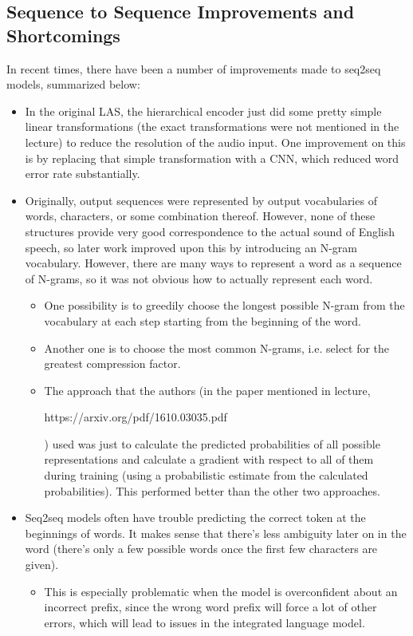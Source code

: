 \subsection{Sequence to Sequence Improvements and Shortcomings}

In recent times, there have been a number of improvements made to seq2seq models, summarized below:
\begin{itemize}
\item In the original LAS, the hierarchical encoder just did some pretty simple linear transformations (the exact transformations were not mentioned in the lecture) to reduce the resolution of the audio input. One improvement on this is by replacing that simple transformation with a CNN, which reduced word error rate substantially.
\item Originally, output sequences were represented by output vocabularies of words, characters, or some combination thereof. However, none of these structures provide very good correspondence to the actual sound of English speech, so later work improved upon this by introducing an N-gram vocabulary. However, there are many ways to represent a word as a sequence of N-grams, so it was not obvious how to actually represent each word.
\begin{itemize}
\item One possibility is to greedily choose the longest possible N-gram from the vocabulary at each step starting from the beginning of the word.
\item Another one is to choose the most common N-grams, i.e. select for the greatest compression factor.
\item The approach that the authors (in the paper mentioned in lecture, \begin{tt}https://arxiv.org/pdf/1610.03035.pdf\end{tt}) used was just to calculate the predicted probabilities of all possible representations and calculate a gradient with respect to all of them during training (using a probabilistic estimate from the calculated probabilities). This performed better than the other two approaches.
\end{itemize}
\item Seq2seq models often have trouble predicting the correct token at the beginnings of words. It makes sense that there's less ambiguity later on in the word (there's only a few possible words once the first few characters are given).
\begin{itemize}
\item This is especially problematic when the model is overconfident about an incorrect prefix, since the wrong word prefix will force a lot of other errors, which will lead to issues in the integrated language model.

\end{itemize}
\end{itemize}
